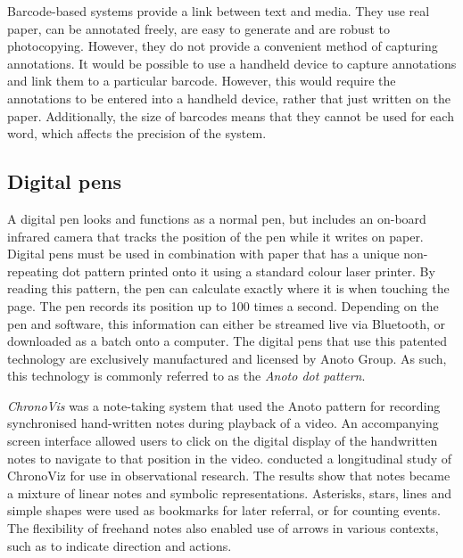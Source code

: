 Barcode-based systems provide a link between text and media. They use real paper, can be annotated freely, are easy to
generate and are robust to photocopying.  However, they do not provide a convenient method of capturing annotations. It
would be possible to use a handheld device to capture annotations and link them to a particular barcode.  However, this
would require the annotations to be entered into a handheld device, rather that just written on the paper.
Additionally, the size of barcodes means that they cannot be used for each word, which affects the precision of the
system.

\subsection{Digital pens}

A digital pen looks and functions as a normal pen, but includes an on-board infrared camera that tracks the position of
the pen while it writes on paper. Digital pens must be used in combination with paper that has a unique non-repeating
dot pattern printed onto it using a standard colour laser printer.  By reading this pattern, the pen can calculate
exactly where it is when touching the page. The pen records its position up to 100 times a second.  Depending on the
pen and software, this information can either be streamed live via Bluetooth, or downloaded as a batch onto a computer.
The digital pens that use this patented technology \citep{Fahraeus2003} are exclusively manufactured and licensed by
Anoto Group. As such, this technology is commonly referred to as the \textit{Anoto dot pattern}.

\textit{ChronoVis} \citep{Fouse2011} was a note-taking system that used the Anoto pattern for recording synchronised
hand-written notes during playback of a video. An accompanying screen interface allowed users to click on the digital
display of the handwritten notes to navigate to that position in the video. %
\citet{Weibel2012} conducted a longitudinal study of ChronoViz for use in observational research. The results show that
notes became a mixture of linear notes and symbolic representations.  Asterisks, stars, lines and simple shapes were
used as bookmarks for later referral, or for counting events.  The flexibility of freehand notes also enabled use of
arrows in various contexts, such as to indicate direction and actions.

